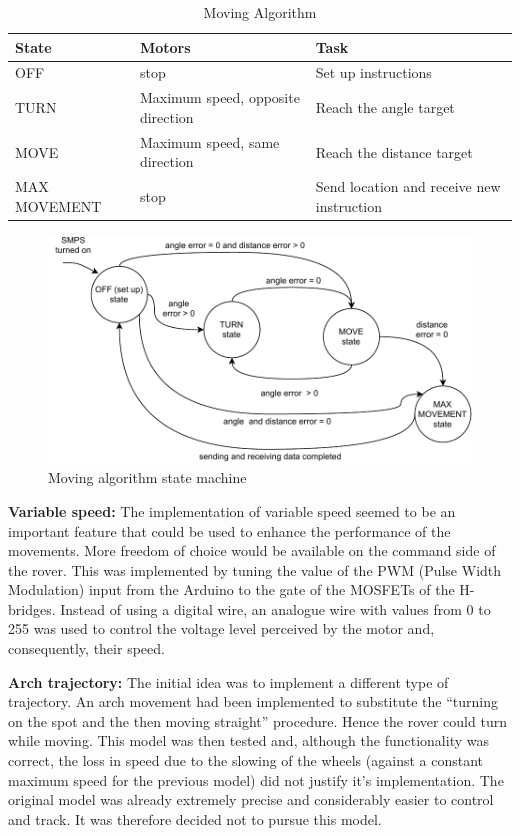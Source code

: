 \documentclass[10pt,twoside]{article}
\begin{document}
\begin{table}[hbt]
\centering
\renewcommand{\arraystretch}{1.3}
\begin{tabular}{@{}lll@{}}
\toprule
State & Motors                     & Task                               \\ \midrule
OFF            & stop                                & Set up   instructions                       \\
TURN           & Maximum speed,   opposite direction & Reach the   angle target                    \\
MOVE           & Maximum speed,   same direction     & Reach the   distance target                 \\
MAX MOVEMENT   & stop                                & Send location   and receive new instruction \\ \bottomrule
\end{tabular}
\caption{Moving Algorithm}
\end{table}
 
 \begin{figure}[hbt]
     \centering
     \includegraphics[scale = 0.8]{movestate.pdf}
     \caption{Moving algorithm state machine}
     \label{fig:my_label}
 \end{figure}
\textbf{Variable speed:} The implementation of variable speed seemed to be an important feature that could be used to enhance the performance of the movements. More freedom of choice would be available on the command side of the rover. This was implemented by tuning the value of the PWM (Pulse Width Modulation) input from the Arduino to the gate of the MOSFETs of the H-bridges. Instead of using a digital wire, an analogue wire with values from 0 to 255 was used to control the voltage level perceived by the motor and, consequently, their speed. 

\textbf{Arch trajectory:} The initial idea was to implement a different type of trajectory. An arch movement had been implemented to substitute the “turning on the spot and the then moving straight” procedure. Hence the rover could turn while moving. This model was then tested and, although the functionality was correct, the loss in speed due to the slowing of the wheels (against a constant maximum speed for the previous model) did not justify it's implementation. The original model was already extremely precise and considerably easier to control and track. It was therefore decided not to pursue this model.
\end{document}

